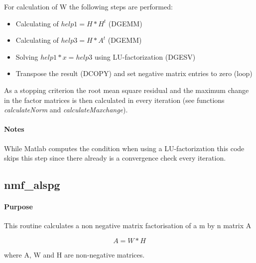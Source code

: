 \documentclass[a4paper,10pt]{scrartcl}
\begin{document}
					For calculation of W the following steps are performed:\newline
					
					\begin{itemize}
					 \item Calculating of $help1 = H * H^t$ (DGEMM)\newline
					 \item Calculating of $help3 = H * A^t$ (DGEMM)\newline
					 \item Solving $help1 * x = help3$ using LU-factorization (DGESV)\newline
					 \item Transpose the result (DCOPY) and set negative matrix entries to 
						zero (loop)\newline
					\end{itemize}



					As a stopping criterion the root mean square residual and the maximum 
					change in the factor matrices is then calculated in every iteration (see
					functions \emph{calculateNorm} and \emph{calculateMaxchange}).\newline

			\paragraph{Notes}


					While Matlab computes the condition when using a LU-factorization this code
					skips this step since there already is a convergence check every iteration.

		\subsection{nmf\_alspg}

			\paragraph{Purpose}

					This routine calculates a non negative matrix factorisation of a m by n 
					matrix A\newline
					
					\begin{equation*}
						A = W * H
					\end{equation*}

 					where A, W and H are non-negative matrices.
\end{document}
